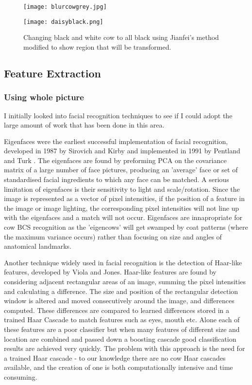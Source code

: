 \documentclass[11pt]{article}
\begin{document}
	\begin{figure}[h]
		\centering
		\parbox{6cm}{\texttt{[image: blurcowgrey.jpg]}}
		\parbox{6cm}{\texttt{[image: daisyblack.png]}}
		\caption{Changing black and white cow to all black using Jianfei's method modified to show region that will be transformed.\cite{Jianfei2011}}
	\end{figure}
\newpage
\subsection{Feature Extraction}
	\subsubsection{Using whole picture}
	I initially looked into facial recognition techniques to see if I could adopt the large amount of work that has been done in this area.


	Eigenfaces were the earliest successful implementation of facial recognition, developed in 1987 by Sirovich and Kirby and implemented in 1991 by Pentland and Turk \cite{Turk1991}.
	The eigenfaces are found by preforming PCA on the covariance matrix of a large number of face pictures, producing an 'average' face or set of standardised facial ingredients to which any face can be matched.
	A serious limitation of eigenfaces is their sensitivity to light and scale/rotation. 
	Since the image is represented as a vector of pixel intensities, if the position of a feature in the image or image lighting, the corresponding pixel intensities will not line up with the eigenfaces and a match will not occur.
	Eigenfaces are innapropriate for cow BCS recognition as the 'eigencows' will get swamped by coat patterns (where the maximum variance occurs) rather than focusing on size and angles of anatomical landmarks.



	Another technique widely used in facial recognition is the detection of Haar-like features, developed by Viola and Jones\cite{viola2004}.
	Haar-like features are found by considering adjacent rectangular areas of an image, summing the pixel intensities and calculating a difference. 
	The size and position of the rectangular detection window is altered and moved consecutively around the image, and differences computed.
	These differences are compared to learned differences stored in a trained Haar Cascade to match features such as eyes, mouth etc.
	Alone each of these features are a poor classifier but when many features of different size and location are combined and passed down a boosting cascade good classification results are achieved very quickly.
	The problem with this approach is the need for a trained Haar cascade - to our knowledge there are no cow Haar cascades available, and the creation of one is both computationally intensive and time consuming.
	
\end{document}
